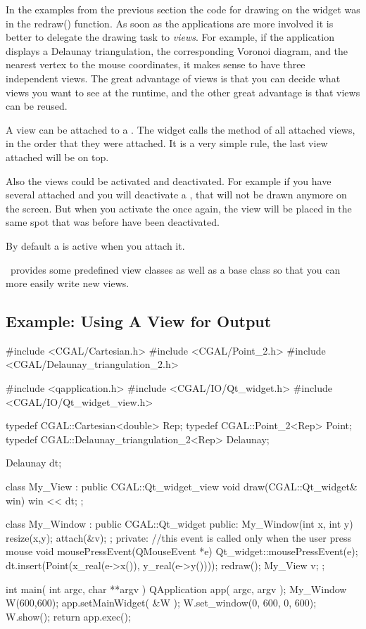 In the examples from the previous section the code for drawing on the
widget was in the redraw() function. As soon as the applications are more 
involved it is better to delegate the drawing task to {\em views}. 
For example, if the application displays a Delaunay triangulation, the corresponding Voronoi diagram,
 and the nearest vertex to the mouse coordinates, it makes
sense to have three independent views. The great advantage of views is that you
 can decide what views you want to see at the runtime, and the other great 
advantage is that views can be reused.

A view can be attached to a . The widget calls the method  of all attached views, in the order 
that they were attached. It is a very simple rule, the last view attached will be on top.

Also the views could be activated and deactivated. For example if you have several  attached and you
will deactivate a , that  will not be drawn anymore on the screen. But when you activate 
the  once again, the view will be placed in the same spot that was before have been deactivated.

By default a  is active when you attach it.

\cgal\ provides some predefined view classes as well as a base class
so that you can more easily write new views.


\subsection{Example: Using A View for Output}

\begin{ccExampleCode}
#include <CGAL/Cartesian.h>
#include <CGAL/Point_2.h>
#include <CGAL/Delaunay_triangulation_2.h>


#include <qapplication.h>
#include <CGAL/IO/Qt_widget.h>
#include <CGAL/IO/Qt_widget_view.h>

typedef CGAL::Cartesian<double>		    Rep;
typedef CGAL::Point_2<Rep>		    Point;
typedef CGAL::Delaunay_triangulation_2<Rep> Delaunay;

Delaunay dt;

class My_View : public CGAL::Qt_widget_view{
  void draw(CGAL::Qt_widget& win){
    win << dt;
  }
};

class My_Window : public CGAL::Qt_widget {
public:
  My_Window(int x, int y)
  {
    resize(x,y);
    attach(&v);
  };
private:
  //this event is called only when the user press mouse
  void mousePressEvent(QMouseEvent *e)
  {
    Qt_widget::mousePressEvent(e);
    dt.insert(Point(x_real(e->x()), y_real(e->y())));
    redraw();
  }
  My_View v;
};

int main( int argc, char **argv )
{
    QApplication app( argc, argv );
    My_Window W(600,600);
    app.setMainWidget( &W );
    W.set_window(0, 600, 0, 600);
    W.show();
    return app.exec();
}
\end{ccExampleCode}

